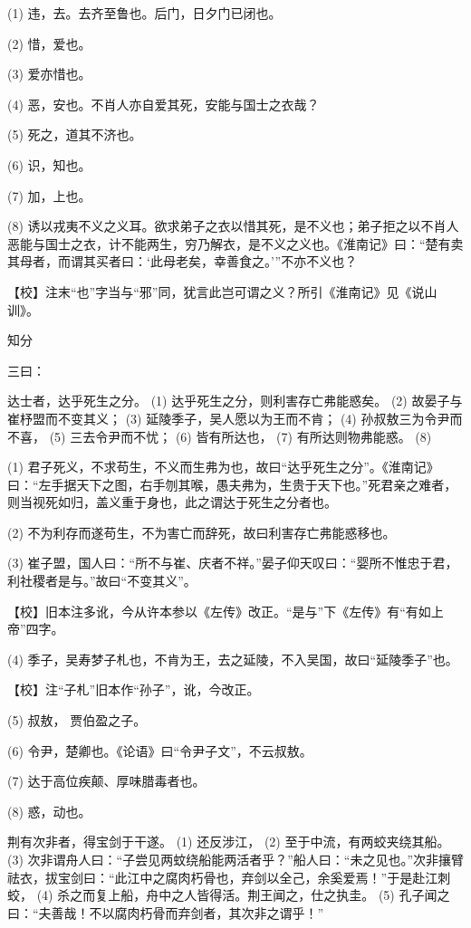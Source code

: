 \documentclass[12pt,UTF8]{ctexbook}
\begin{document}
(1) 违，去。去齐至鲁也。后门，日夕门已闭也。

(2) 惜，爱也。

(3) 爱亦惜也。

(4) 恶，安也。不肖人亦自爱其死，安能与国士之衣哉？

(5) 死之，道其不济也。

(6) 识，知也。

(7) 加，上也。

(8) 诱以戎夷不义之义耳。欲求弟子之衣以惜其死，是不义也；弟子拒之以不肖人恶能与国士之衣，计不能两生，穷乃解衣，是不义之义也。《淮南记》曰：“楚有卖其母者，而谓其买者曰：‘此母老矣，幸善食之。’”不亦不义也？

【校】注末“也”字当与“邪”同，犹言此岂可谓之义？所引《淮南记》见《说山训》。





知分


三曰：

达士者，达乎死生之分。 (1) 达乎死生之分，则利害存亡弗能惑矣。 (2) 故晏子与崔杼盟而不变其义； (3) 延陵季子，吴人愿以为王而不肯； (4) 孙叔敖三为令尹而不喜， (5) 三去令尹而不忧； (6) 皆有所达也， (7) 有所达则物弗能惑。 (8)

(1) 君子死义，不求苟生，不义而生弗为也，故曰“达乎死生之分”。《淮南记》曰：“左手据天下之图，右手刎其喉，愚夫弗为，生贵于天下也。”死君亲之难者，则当视死如归，盖义重于身也，此之谓达于死生之分者也。

(2) 不为利存而遂苟生，不为害亡而辞死，故曰利害存亡弗能惑移也。

(3) 崔子盟，国人曰：“所不与崔、庆者不祥。”晏子仰天叹曰：“婴所不惟忠于君，利社稷者是与。”故曰“不变其义”。

【校】旧本注多讹，今从许本参以《左传》改正。“是与”下《左传》有“有如上帝”四字。

(4) 季子，吴寿梦子札也，不肯为王，去之延陵，不入吴国，故曰“延陵季子”也。

【校】注“子札”旧本作“孙子”，讹，今改正。

(5) 叔敖， 贾伯盈之子。

(6) 令尹，楚卿也。《论语》曰“令尹子文”，不云叔敖。

(7) 达于高位疾颠、厚味腊毒者也。

(8) 惑，动也。

荆有次非者，得宝剑于干遂。 (1) 还反涉江， (2) 至于中流，有两蛟夹绕其船。 (3) 次非谓舟人曰：“子尝见两蚊绕船能两活者乎？”船人曰：“未之见也。”次非攘臂祛衣，拔宝剑曰：“此江中之腐肉朽骨也，弃剑以全己，余奚爱焉！”于是赴江刺蛟， (4) 杀之而复上船，舟中之人皆得活。荆王闻之，仕之执圭。 (5) 孔子闻之曰：“夫善哉！不以腐肉朽骨而弃剑者，其次非之谓乎！”
\end{document}
